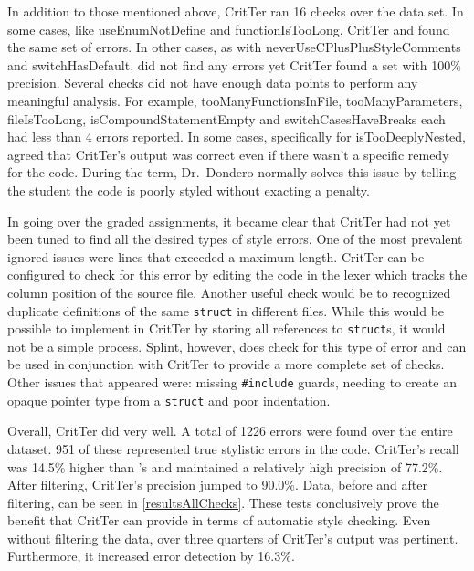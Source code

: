 \documentclass[12pt]{report}
\newcommand{\programName}{CritTer\xspace}
\begin{document}
In addition to those mentioned above, \programName ran 16 checks over the data set. In some cases, 
like useEnumNotDefine and functionIsTooLong, \programName and \human found the same set of 
errors. In other cases, as with neverUseCPlusPlusStyleComments and switchHasDefault, \human did not 
find any errors yet \programName found a set with 100\% precision. Several checks did not have enough 
data points to perform any meaningful analysis. For example, tooManyFunctionsInFile, 
tooManyParameters, fileIsTooLong, isCompoundStatementEmpty and switchCasesHaveBreaks each 
had less than 4 errors reported. In some cases, specifically for isTooDeeplyNested, \human agreed that 
\programName's output was correct even if there wasn't a specific remedy for the code. During the term, 
Dr.\ Dondero normally solves this issue by telling the student the code is poorly styled without exacting a 
penalty.

In going over the graded assignments, it became clear that \programName had not yet been tuned to find 
all the desired types of style errors. One of the most prevalent ignored issues were lines that exceeded a 
maximum length. \programName can be configured to check for this error by editing the code in the lexer 
which tracks the column position of the source file. Another useful check would be to recognized 
duplicate definitions of the same \lstinline{struct} in different files. While this would be possible to 
implement in \programName by storing all references to \lstinline{struct}s, it would not be a simple 
process. Splint, however, does check for this type of error and can be used in conjunction with 
\programName to provide a more complete set of checks. Other issues that appeared were: missing 
\lstinline{#include} guards, needing to create an opaque pointer type from a \lstinline{struct} and poor 
indentation.

Overall, \programName did very well. A total of 1226 errors were found over the entire dataset. 
951 of these represented true stylistic errors in the code. \programName's recall was 14.5\% 
higher than \human's and maintained a relatively high precision of 77.2\%. After filtering, 
\programName's precision jumped to 90.0\%. Data, before and after filtering, can be seen in 
\autoref{resultsAllChecks}. These tests conclusively prove the benefit that \programName can provide in 
terms of automatic style checking. Even without filtering the data, over three quarters of \programName's 
output was pertinent. Furthermore, it increased error detection by 16.3\%.
\end{document}
